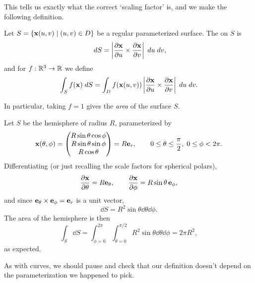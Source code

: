 \documentclass[a4paper]{scrartcl}
\begin{document}
This tells us exactly what the correct `scaling factor' is, and we make the following definition.

\begin{definition}
	Let $S = \{\mathbf{x}(u, v) \mid (u, v) \in D\}$ be a regular parameterized surface. The  on $S$ is
	$$
	\; d S = \left|\frac{\partial \mathbf{x}}{\partial u} \times \frac{\partial \mathbf{x}}{\partial v}\right| \; d u \; d v,
	$$
	and for $f : \mathbb{R}^3 \rightarrow \mathbb{R}$ we define
	$$
	\int_S f(\mathbf{x}) \; d S = \int_D f(\mathbf{x}(u, v)) \left|\frac{\partial \mathbf{x}}{\partial u} \times \frac{\partial \mathbf{x}}{\partial v}\right| \; d u \; d v.
	$$
\end{definition}

In particular, taking $f = 1$ gives the \emph{area} of the surface $S$.

\begin{example}
	Let $S$ be the hemisphere of radius $R$, parameterized by
	$$
	\mathbf{x}(\theta, \phi) = \begin{pmatrix}
		R \sin \theta \cos \phi \\
		R \sin \theta \sin \phi \\
		R \cos \theta
	\end{pmatrix} = R \mathbf{e}_r, \quad \quad 0 \leq \theta \leq \frac{\pi}{2}, \; 0 \leq \phi < 2\pi.
	$$
	Differentiating (or just recalling the scale factors for spherical polars),
	$$
	\frac{\partial \mathbf{x}}{\partial \theta} = R \mathbf{e}_\theta, \quad \quad \frac{\partial \mathbf{x}}{\partial \phi} = R \sin \theta \, \mathbf{e}_\phi,
	$$
	and since $\mathbf{e}_\theta \times \mathbf{e}_\phi = \mathbf{e}_r$ is a unit vector,
	$$
	\dd S = R^2 \sin \theta \dd \theta \dd \phi.
	$$
	The area of the hemisphere is then
	$$
	\int_S \dd S = \int_{\phi = 0}^{2 \pi} \int_{\theta = 0}^{\pi/2} R^2 \sin \theta \dd \theta \dd \phi = 2 \pi R^2,
	$$
	as expected.
\end{example}

As with curves, we should pause and check that our definition doesn't depend on the parameterization we happened to pick.
\end{document}
